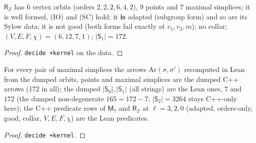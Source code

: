 \begin{theorem}\label{thm:mp-rz-rules}
  \leanok
  $\mathsf R_{\mathbb Z}$ has $6$ vertex orbits (orders $2,2,2,6,4,2$), $9$ points and $7$ maximal simplices; it is well formed, (IO) and
  (SC) hold; it \textbf{is} adapted (subgroup form) and so are its Sylow data; it is not good (both forms fail exactly at $v_1,v_2,m$);
  no collar; $(V,E,F,\chi)=(6,12,7,1)$; $\lvert \mathsf S_1\rvert=172$.
\end{theorem}
\begin{proof}
  \leanok
  \texttt{decide +kernel} on the data.
\end{proof}

\begin{theorem}\label{thm:mp-rz-dump}
  \leanok
  For every pair of maximal simplices the arrows $\mathrm{Ar}(\sigma,\sigma')$ recomputed in Lean from the dumped orbits, points and
  maximal simplices are the dumped C++ arrows (172 in all); the dumped $\lvert \mathsf S_0\rvert,\lvert \mathsf S_1\rvert$ (all strings) are the Lean
  ones, $7$ and $172$ (the dumped non-degenerate $165=172-7$; $\lvert \mathsf S_2\rvert=3264$ stays C++-only here); the C++ predicate rows of
  $\mathsf M_7$ and $\mathsf R_{\mathbb Z}$ at $\ell=3,2,0$ (adapted, orders-only, good, collar, $V,E,F,\chi$) are the Lean predicates.
\end{theorem}
\begin{proof}
  \leanok
  \texttt{decide +kernel}.
\end{proof}

